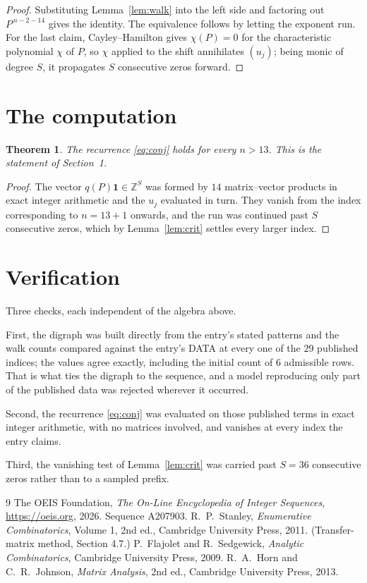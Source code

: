 \documentclass[11pt,a4paper]{article}
\theoremstyle{plain}
\newtheorem{theorem}{Theorem}
\theoremstyle{definition}
\begin{document}
\begin{proof}
Substituting Lemma~\ref{lem:walk} into the left side and factoring out
$P^{\,n-2-14}$ gives the identity. The equivalence follows by letting the exponent
run. For the last claim, Cayley--Hamilton gives $\chi(P)=0$ for the characteristic
polynomial $\chi$ of $P$, so $\chi$ applied to the shift annihilates $(u_j)$; being monic of
degree $S$, it propagates $S$ consecutive zeros forward.
\end{proof}

\section{The computation}

\begin{theorem}
The recurrence \eqref{eq:conj} holds for every $n>13$. This is the statement of
Section~1.
\end{theorem}

\begin{proof}
The vector $q(P)\mathbf{1}\in\mathbb{Z}^{S}$ was formed by $14$ matrix--vector
products in exact integer arithmetic and the $u_j$ evaluated in turn. They vanish from the
index corresponding to $n=13+1$ onwards, and the run was continued past $S$ consecutive
zeros, which by Lemma~\ref{lem:crit} settles every larger index.
\end{proof}

\section{Verification}

Three checks, each independent of the algebra above.

First, the digraph was built directly from the entry's stated patterns and the walk counts
compared against the entry's DATA at every one of the $29$ published indices; the
values agree exactly, including the initial count of $6$ admissible rows. That is
what ties the digraph to the sequence, and a model reproducing only part of the published
data was rejected wherever it occurred.

Second, the recurrence \eqref{eq:conj} was evaluated on those published terms in exact
integer arithmetic, with no matrices involved, and vanishes at every index the entry claims.

Third, the vanishing test of Lemma~\ref{lem:crit} was carried past $S=36$ consecutive
zeros rather than to a sampled prefix.

\begin{thebibliography}{9}
 The OEIS Foundation, \emph{The On-Line Encyclopedia of Integer
Sequences}, \url{https://oeis.org}, 2026. Sequence A207903.
 R.~P.~Stanley, \emph{Enumerative Combinatorics}, Volume 1, 2nd ed.,
Cambridge University Press, 2011. (Transfer-matrix method, Section 4.7.)
 P.~Flajolet and R.~Sedgewick, \emph{Analytic Combinatorics}, Cambridge
University Press, 2009.
 R.~A.~Horn and C.~R.~Johnson, \emph{Matrix Analysis}, 2nd ed., Cambridge
University Press, 2013.
\end{thebibliography}
\end{document}
